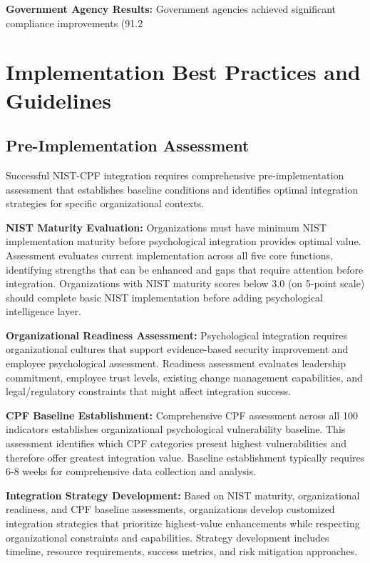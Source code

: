 \documentclass[10pt, twocolumn]{article}
\begin{document}
\textbf{Government Agency Results:} Government agencies achieved significant compliance improvements (91.2%

\section{Implementation Best Practices and Guidelines}

\subsection{Pre-Implementation Assessment}

Successful NIST-CPF integration requires comprehensive pre-implementation assessment that establishes baseline conditions and identifies optimal integration strategies for specific organizational contexts.

\textbf{NIST Maturity Evaluation:} Organizations must have minimum NIST implementation maturity before psychological integration provides optimal value. Assessment evaluates current implementation across all five core functions, identifying strengths that can be enhanced and gaps that require attention before integration. Organizations with NIST maturity scores below 3.0 (on 5-point scale) should complete basic NIST implementation before adding psychological intelligence layer.

\textbf{Organizational Readiness Assessment:} Psychological integration requires organizational cultures that support evidence-based security improvement and employee psychological assessment. Readiness assessment evaluates leadership commitment, employee trust levels, existing change management capabilities, and legal/regulatory constraints that might affect integration success.

\textbf{CPF Baseline Establishment:} Comprehensive CPF assessment across all 100 indicators establishes organizational psychological vulnerability baseline. This assessment identifies which CPF categories present highest vulnerabilities and therefore offer greatest integration value. Baseline establishment typically requires 6-8 weeks for comprehensive data collection and analysis.

\textbf{Integration Strategy Development:} Based on NIST maturity, organizational readiness, and CPF baseline assessments, organizations develop customized integration strategies that prioritize highest-value enhancements while respecting organizational constraints and capabilities. Strategy development includes timeline, resource requirements, success metrics, and risk mitigation approaches.
\end{document}
